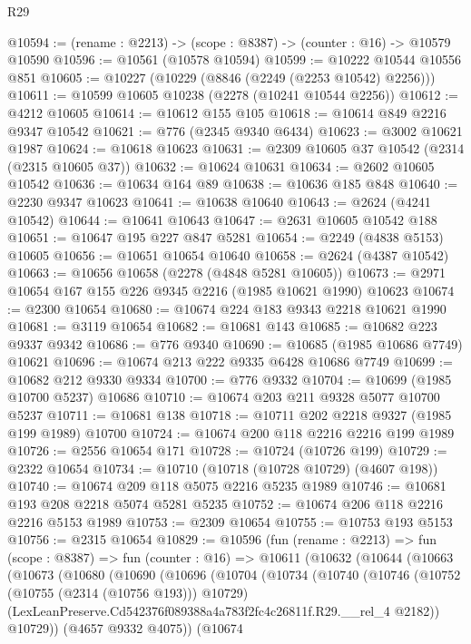 \begin{lexlean}{R29}
\begin{coremodule}
@10594 := (rename : @2213) -> (scope : @8387) -> (counter : @16) -> @10579 @10590
@10596 := @10561 (@10578 @10594)
@10599 := @10222 @10544 @10556 @851
@10605 := @10227 (@10229 (@8846 (@2249 (@2253 @10542) @2256)))
@10611 := @10599 @10605 @10238 (@2278 (@10241 @10544 @2256))
@10612 := @4212 @10605
@10614 := @10612 @155 @105
@10618 := @10614 @849 @2216 @9347 @10542
@10621 := @776 (@2345 @9340 @6434)
@10623 := @3002 @10621 @1987
@10624 := @10618 @10623
@10631 := @2309 @10605 @37 @10542 (@2314 (@2315 @10605 @37))
@10632 := @10624 @10631
@10634 := @2602 @10605 @10542
@10636 := @10634 @164 @89
@10638 := @10636 @185 @848
@10640 := @2230 @9347 @10623
@10641 := @10638 @10640
@10643 := @2624 (@4241 @10542)
@10644 := @10641 @10643
@10647 := @2631 @10605 @10542 @188
@10651 := @10647 @195 @227 @847 @5281
@10654 := @2249 (@4838 @5153) @10605
@10656 := @10651 @10654 @10640
@10658 := @2624 (@4387 @10542)
@10663 := @10656 @10658 (@2278 (@4848 @5281 @10605))
@10673 := @2971 @10654 @167 @155 @226 @9345 @2216 (@1985 @10621 @1990) @10623
@10674 := @2300 @10654
@10680 := @10674 @224 @183 @9343 @2218 @10621 @1990
@10681 := @3119 @10654
@10682 := @10681 @143
@10685 := @10682 @223 @9337 @9342
@10686 := @776 @9340
@10690 := @10685 (@1985 @10686 @7749) @10621
@10696 := @10674 @213 @222 @9335 @6428 @10686 @7749
@10699 := @10682 @212 @9330 @9334
@10700 := @776 @9332
@10704 := @10699 (@1985 @10700 @5237) @10686
@10710 := @10674 @203 @211 @9328 @5077 @10700 @5237
@10711 := @10681 @138
@10718 := @10711 @202 @2218 @9327 (@1985 @199 @1989) @10700
@10724 := @10674 @200 @118 @2216 @2216 @199 @1989
@10726 := @2556 @10654 @171
@10728 := @10724 (@10726 @199)
@10729 := @2322 @10654
@10734 := @10710 (@10718 (@10728 @10729) (@4607 @198))
@10740 := @10674 @209 @118 @5075 @2216 @5235 @1989
@10746 := @10681 @193 @208 @2218 @5074 @5281 @5235
@10752 := @10674 @206 @118 @2216 @2216 @5153 @1989
@10753 := @2309 @10654
@10755 := @10753 @193 @5153
@10756 := @2315 @10654
@10829 := @10596
    (fun (rename : @2213) =>
    fun (scope : @8387) =>
    fun (counter : @16) =>
    @10611
      (@10632
        (@10644
          (@10663
            (@10673
              (@10680
                (@10690
                  (@10696
                    (@10704
                      (@10734
                        (@10740
                          (@10746
                            (@10752 (@10755 (@2314 (@10756 @193))) @10729)
                            (LexLeanPreserve.Cd542376f089388a4a783f2fc4c26811f.R29.__rel_4 @2182))
                          @10729))
                      (@4657 @9332 @4075))
                    (@10674

\end{coremodule}
\end{lexlean}
